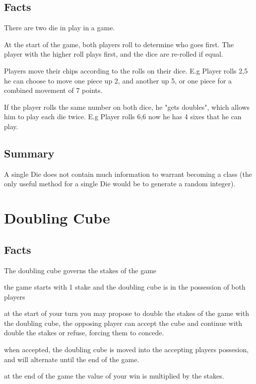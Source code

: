\documentclass{report}
\begin{document}
\subsection{Facts}

\begin{dashed}
    \item There are two die in play in a game.
    \item At the start of the game, both players roll to determine who goes first.
The player with the higher roll plays first, and the dice are re-rolled if equal.
    \item Players move their chips according to the rolls on their dice.
        E.g Player rolls 2,5 he can choose to move one piece up 2, and another up 5,
        or one piece for a combined movement of 7 points.
    \item If the player rolls the same number on both dice, he "gets doubles", which
        allows him to play each die twice.
        E.g Player rolls 6,6 now he has 4 sixes that he can play.

\end{dashed}

\subsection{Summary}

A single Die does not contain much information to warrant becoming a class (the
only useful method for a single Die would be to generate a random integer).

\section{Doubling Cube}

\subsection{Facts}
\begin{dashed}
\item The doubling cube governs the stakes of the game
\item the game starts with 1 stake and the doubling cube is in the possession of both players
\item at the start of your turn you may propose to double the stakes of the game with the doubling cube, the opposing player can accept the cube and continue with double the stakes or refuse, forcing them to concede.
\item when accepted, the doubling cube is moved into the accepting players possesion, and will alternate until the end of the game.
\item at the end of the game the value of your win is multiplied by the stakes.
\end{dashed}
\end{document}

